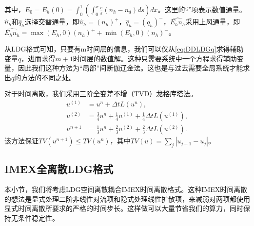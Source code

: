 其中，$E_{0}=E_h(0)=\int_{0}^{1}\left(\int_{0}^{x} \frac{e}{\varepsilon}\left(n_h-n_{d}\right) d s\right) d x$。这里的“$\hat{}$”项表示数值通量。$\hat{n}_{h}$和$\hat{q}_{h}$选择交替通量，即$\hat{n}_{h}=\left(n_h\right)^{+}$，$\hat{q}_{h}=\left(q_h\right)^{-}$，$\widehat{E_h n_h}$采用上风通量，即$\widehat{E_h n_h}=\max \left(E_h, 0\right)\left(n_h\right)^{+}+\min \left(E_h, 0\right)\left(n_h\right)^{-}$。

从LDG格式可知，只要有m时间层的信息，我们可以仅从\eqref{eq:DDLDGq}求得辅助变量$q$，进而求得$m+1$时间层的数值解。这种只需要系统中一个方程求得辅助变量，因此我们这种方法为“局部”间断伽辽金法。这也是与过去需要全局系统才能求出$q$的方法的不同之处。

对于时间离散，我们采用三阶全变差不增（TVD）龙格库塔法。
\begin{align}
    u^{(1)} & = u^n + \Delta t L(u^n),                                                \\
    u^{(2)} & = \frac{3}{4}u^n + \frac{1}{4}u^{(1)} + \frac{1}{4}\Delta t L(u^{(1)}), \\
    u^{n+1} & = \frac{1}{3}u^n + \frac{2}{3}u^{(2)} + \frac{2}{3}\Delta t L(u^{(2)}).
\end{align}
该方法保证$TV(u^{n+1})\leq TV(u^n)$，其中$TV(u) = \sum_j |u_{j+1}-u_j|$。
\subsection{IMEX全离散LDG格式}
本小节，我们将考虑LDG空间离散耦合IMEX时间离散格式。这种IMEX时间离散的想法是显式处理二阶非线性对流项和隐式处理线性扩散项，来减弱对两项都使用显式时间离散所要求的严格的时间步长。这样做可以大量节省我们的算力，同时保持无条件稳定性。

